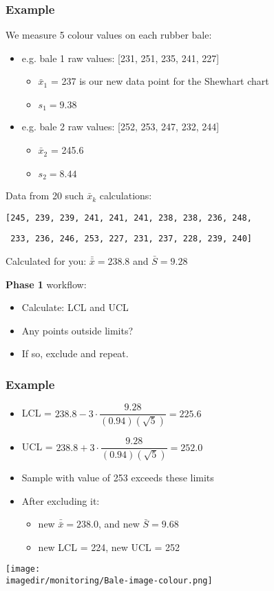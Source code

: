 \begin{frame}\frametitle{Example}
	
	We measure 5 colour values on each rubber bale: 
	\begin{itemize}
		\item	e.g. bale 1 raw values: [231, 251, 235, 241, 227] 
		\begin{itemize}
			\item	$\bar{x}_1$ = 237 is our new data point for the Shewhart chart 
			\item	$s_1 = 9.38$ 
		\end{itemize}
		\item	e.g. bale 2 raw values: [252, 253, 247, 232, 244] 
		\begin{itemize}
			\item	$\bar{x}_2$ = 245.6 
			\item	$s_2 = 8.44$ 
		\end{itemize}
	\end{itemize}
	
	Data from 20 such $\bar{x}_k$ calculations:
	
	\texttt{[245, 239, 239, 241, 241, 241, 238, 238, 236, 248, }
	
	\texttt{ 233, 236, 246, 253, 227, 231, 237, 228, 239, 240]}
	
	Calculated for you: $\bar{\bar{x}} = 238.8$ and $\bar{S} = 9.28$
	
	\textbf{Phase 1} workflow: 
	\begin{itemize}
		\item	Calculate: LCL and UCL 
		\item	Any points outside limits? 
		\item	If so, exclude and repeat. 
	\end{itemize}
\end{frame}

\begin{frame}\frametitle{Example}
	\begin{itemize}
		\item	LCL = $238.8 - 3 \cdot \dfrac{9.28}{(0.94)(\sqrt{5})} = 225.6$ 
		\item	UCL = $238.8 + 3 \cdot \dfrac{9.28}{(0.94)(\sqrt{5})} = 252.0$ 
		\item	Sample with value of 253 exceeds these limits 
		\item	After excluding it: 
		\begin{itemize}
			\item	new $\bar{\bar{x}} = 238.0$, and new $\bar{S} = 9.68$ 
			\item	new LCL = 224, new UCL = 252 
		\end{itemize}
	\end{itemize}
	
	\texttt{[image: \\imagedir/monitoring/Bale-image-colour.png]}
\end{frame}

